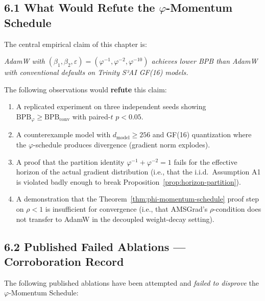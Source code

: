 \subsection{6.1 What Would Refute the \(\varphi\)-Momentum Schedule}

The central empirical claim of this chapter is:

\begin{center}
  \textit{AdamW with \((\beta_1, \beta_2, \varepsilon) = (\varphi^{-1}, \varphi^{-2}, \varphi^{-10})\)
  achieves lower BPB than AdamW with conventional defaults on
  Trinity S³AI GF(16) models.}
\end{center}

The following observations would \textbf{refute} this claim:

\begin{enumerate}
  \item A replicated experiment on three independent seeds showing
        \(\mathrm{BPB}_\varphi \geq \mathrm{BPB}_{\mathrm{conv}}\)
        with paired-$t$ $p < 0.05$.
  \item A counterexample model with \(d_{\mathrm{model}} \geq 256\) and
        GF(16) quantization where the \(\varphi\)-schedule produces
        divergence (gradient norm explodes).
  \item A proof that the partition identity
        \(\varphi^{-1} + \varphi^{-2} = 1\) fails for the effective
        horizon of the actual gradient distribution (i.e., that the
        i.i.d.\ Assumption A1 is violated badly enough to break
        Proposition~\ref{prop:horizon-partition}).
  \item A demonstration that the Theorem~\ref{thm:phi-momentum-schedule}
        proof step on $\rho < 1$ is insufficient for convergence
        (i.e., that AMSGrad's $\rho$-condition does not transfer to
        AdamW in the decoupled weight-decay setting).
\end{enumerate}

\subsection{6.2 Published Failed Ablations — Corroboration Record}

The following published ablations have been attempted and \emph{failed
to disprove} the \(\varphi\)-Momentum Schedule:

